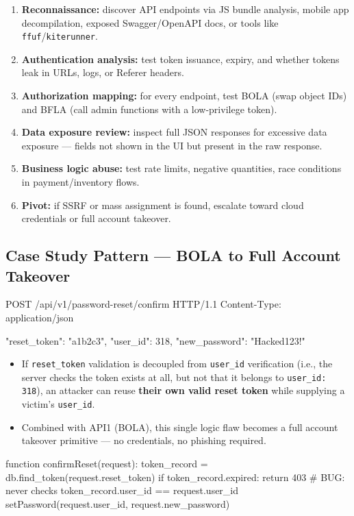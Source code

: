 \documentclass[11pt]{article}
\begin{document}
\begin{enumerate}
  \item \textbf{Reconnaissance:} discover API endpoints via JS bundle analysis, mobile app decompilation, exposed Swagger/OpenAPI docs, or tools like \texttt{ffuf}/\texttt{kiterunner}.
  \item \textbf{Authentication analysis:} test token issuance, expiry, and whether tokens leak in URLs, logs, or Referer headers.
  \item \textbf{Authorization mapping:} for every endpoint, test BOLA (swap object IDs) and BFLA (call admin functions with a low-privilege token).
  \item \textbf{Data exposure review:} inspect full JSON responses for excessive data exposure --- fields not shown in the UI but present in the raw response.
  \item \textbf{Business logic abuse:} test rate limits, negative quantities, race conditions in payment/inventory flows.
  \item \textbf{Pivot:} if SSRF or mass assignment is found, escalate toward cloud credentials or full account takeover.
\end{enumerate}

\subsection{Case Study Pattern --- BOLA to Full Account Takeover}
\begin{httpbox}
POST /api/v1/password-reset/confirm HTTP/1.1
Content-Type: application/json

{ "reset_token": "a1b2c3", "user_id": 318, "new_password": "Hacked123!" }
\end{httpbox}

\begin{itemize}
  \item If \texttt{reset\_token} validation is decoupled from \texttt{user\_id} verification (i.e., the server checks the token exists at all, but not that it belongs to \texttt{user\_id: 318}), an attacker can reuse \textbf{their own valid reset token} while supplying a victim's \texttt{user\_id}.
  \item Combined with API1 (BOLA), this single logic flaw becomes a full account takeover primitive --- no credentials, no phishing required.
\end{itemize}

\begin{pseudobox}
function confirmReset(request):
    token_record = db.find_token(request.reset_token)
    if token_record.expired: return 403
    # BUG: never checks token_record.user_id == request.user_id
    setPassword(request.user_id, request.new_password)
\end{pseudobox}
\end{document}
